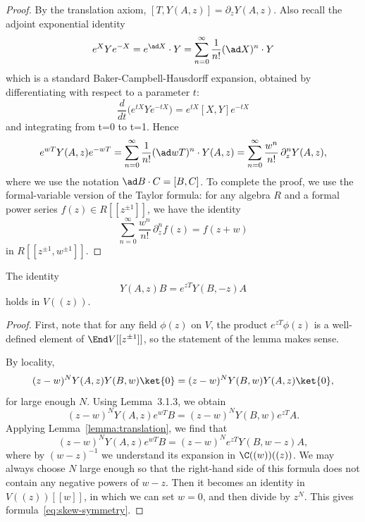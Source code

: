 \documentclass[12pt]{article}
\begin{document}
\begin{proof}
    By the translation axiom, $[T,Y(A,z)] = \partial_z Y(A,z)$. Also recall the adjoint exponential identity \begin{align*}
        e^{X}Ye^{-X} = e^{\ad X} \cdot Y = \sum_{n=0}^\infty \frac{1}{n!} (\ad X)^n \cdot Y
    \end{align*} which is a standard Baker-Campbell-Hausdorff expansion, obtained by differentiating with respect to a parameter $t$:
    \[\frac{d}{dt}\big(e^{tX} Y e^{-tX}\big) = e^{tX}[X,Y]e^{-tX}\]
    and integrating from t=0 to t=1.
    Hence
    \[
        e^{wT} Y(A,z) e^{-wT}
        = \sum_{n=0}^\infty \frac{1}{n!} (\ad wT)^n \cdot Y(A,z)
        = \sum_{n=0}^\infty \frac{w^n}{n!}\,\partial_z^n Y(A,z),
    \]
    where we use the notation $\ad B \cdot C = [B,C]$.
    To complete the proof, we use the formal-variable version of the Taylor formula:
    for any algebra $R$ and a formal power series $f(z) \in R[[z^{\pm1}]]$, we have the identity
    \[
        \sum_{n=0}^\infty \frac{w^n}{n!}\,\partial_z^n f(z) = f(z+w)
    \]
    in $R[[z^{\pm1},w^{\pm1}]]$.
\end{proof}

\begin{proposition}
    \label{prop:skew-symmetry}
    The identity
    \begin{equation}
        \label{eq:skew-symmetry}
        Y(A,z)B = e^{zT} Y(B,-z)A
    \end{equation}
    holds in $V((z))$.
\end{proposition}

\begin{proof}
    First, note that for any field $\phi(z)$ on $V$, the product $e^{zT}\phi(z)$ is a well-defined element of $\End V[[z^{\pm1}]]$, so the statement of the lemma makes sense.

    By locality,
    \[
        (z-w)^N Y(A,z)Y(B,w)\ket{0} = (z-w)^N Y(B,w)Y(A,z)\ket{0},
    \]
    for large enough $N$. Using Lemma~3.1.3, we obtain
    \[
        (z-w)^N Y(A,z) e^{wT} B = (z-w)^N Y(B,w) e^{zT} A.
    \]
    Applying Lemma~\ref{lemma:translation}, we find that
    \[
        (z-w)^N Y(A,z)e^{wT}B = (z-w)^N e^{zT} Y(B,w-z)A,
    \]
    where by $(w-z)^{-1}$ we understand its expansion in $\C((w))((z))$.
    We may always choose $N$ large enough so that the right-hand side
    of this formula does not contain any negative powers of $w-z$.
    Then it becomes an identity in $V((z))[[w]]$, in which we can set $w=0$,
    and then divide by $z^N$. This gives formula~\eqref{eq:skew-symmetry}.
\end{proof}
\end{document}

